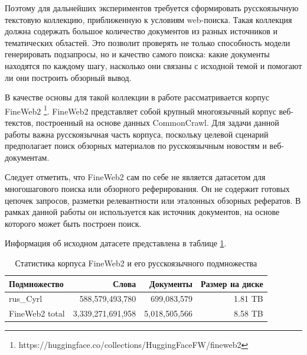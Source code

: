 \documentclass[oneside,senior,etd]{BYUPhys}
\begin{document}
Поэтому для дальнейших экспериментов требуется сформировать русскоязычную текстовую коллекцию, 
приближенную к условиям web-поиска. 
Такая коллекция должна содержать большое количество документов из разных источников и тематических областей. 
Это позволит проверять не только способность модели генерировать подзапросы, 
но и качество самого поиска: какие документы находятся по каждому шагу, 
насколько они связаны с исходной темой и помогают ли они построить обзорный вывод.

В качестве основы для такой коллекции в работе рассматривается корпус FineWeb2 \footnote{https://huggingface.co/collections/HuggingFaceFW/fineweb2}. 
FineWeb2 представляет собой крупный многоязычный корпус веб-текстов, построенный на основе данных CommonCrawl. 
Для задачи данной работы важна русскоязычная часть корпуса, 
поскольку целевой сценарий предполагает поиск обзорных материалов по русскоязычным новостям и веб-документам.

Следует отметить, что FineWeb2 сам по себе не является датасетом для многошагового поиска или обзорного реферирования. 
Он не содержит готовых цепочек запросов, разметки релевантности или эталонных обзорных рефератов. 
В рамках данной работы он используется как источник документов, на основе которого может быть построен поиск.

Информация об исходном датасете представлена в таблице \ref{tab:fineweb2_stats}.
\begin{table}[h]
\centering
\small
\begin{tabular}{|l|r|r|r|}
\hline
Подмножество & Слова & Документы  & Размер на диске \\
\hline
rus\_Cyrl & 588{,}579{,}493{,}780 & 699{,}083{,}579 & 1.81 TB \\
\hline
FineWeb2 total & 3{,}339{,}271{,}691{,}958 & 5{,}018{,}505{,}566 & 8.58 TB \\
\hline
\end{tabular}
\caption{Статистика корпуса FineWeb2 и его русскоязычного подмножества}
\label{tab:fineweb2_stats}
\end{table}
\end{document}
